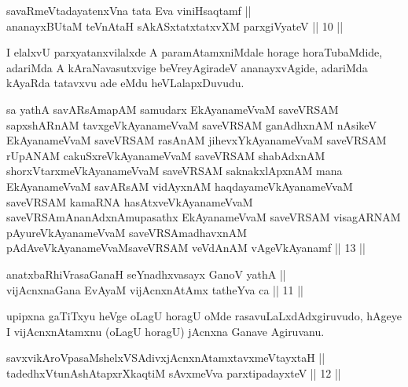 
\begin{shl}
savaRmeVtadayatenxVna tata Eva viniHsaqtamf || \\
ananayxBUtaM teVnAtaH sAkASxtatxtatxvXM parxgiVyateV \hfill || 10 ||  
\end{shl}

\begin{artha}
I elalxvU parxyatanxvilalxde A paramAtamxniMdale horage horaTubaMdide, adariMda A kAraNavasutxvige beVreyAgiradeV ananayxvAgide, adariMda kAyaRda tatavxvu ade eMdu heVLalapxDuvudu.
\end{artha}


\begin{kandikeshl}
sa yathA savARsAmapAM samudarx EkAyanameVvaM saveVRSAM sapxshARnAM tavxgeVkAyanameVvaM saveVRSAM ganAdhxnAM nAsikeV EkAyanameVvaM saveVRSAM rasAnAM jihevxYkAyanameVvaM saveVRSAM rUpANAM cakuSxreVkAyanameVvaM saveVRSAM shabAdxnAM shorxVtarxmeVkAyanameVvaM saveVRSAM saknakxlApxnAM mana EkAyanameVvaM savARsAM vidAyxnAM haqdayameVkAyanameVvaM saveVRSAM kamaRNA hasAtxveVkAyanameVvaM saveVRSAmAnanAdxnAmupasathx EkAyanameVvaM saveVRSAM visagARNAM pAyureVkAyanameVvaM saveVRSAmadhavxnAM pAdAveVkAyanameVvaM\break saveVRSAM veVdAnAM vAgeVkAyanamf || 13 ||
\end{kandikeshl}


\begin{shl}
anatxbaRhiVrasaGanaH seYnadhxvasayx GanoV yathA || \\
vijAcnxnaGana EvAyaM vijAcnxnAtAmx tatheYva ca \hfill || 11 ||  
\end{shl}

\begin{artha}
upipxna gaTiTxyu heVge oLagU horagU oMde rasavuLaLxdAdxgiruvudo, hAgeye I vijAcnxnAtamxnu (oLagU horagU) jAcnxna Ganave Agiruvanu.
\end{artha}


\begin{shl}
savxvikAroVpasaMshelxVSAdivxjAcnxnAtamxtavxmeVtayxtaH || \\
tadedhxVtunAshAtapxrXkaqtiM sAvxmeVva parxtipadayxteV \hfill || 12 ||  
\end{shl}

